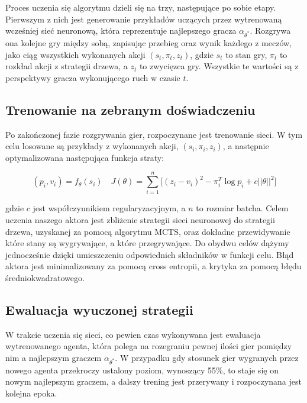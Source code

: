 \documentclass[licencjacka]{pracamgr}
\begin{document}
Proces uczenia się algorytmu dzieli się na trzy, następujące po sobie etapy. Pierwszym z nich jest generowanie przykładów uczących przez wytrenowaną wcześniej sieć neuronową, która reprezentuje najlepszego gracza $\alpha_{\theta^\ast}$. Rozgrywa ona kolejne gry między sobą, zapisując przebieg oraz wynik każdego z meczów, jako ciąg wszystkich wykonanych akcji $(s_t, \pi_t, z_t)$, gdzie $s_t$ to stan gry, $\pi_t$ to rozkład akcji z strategii drzewa, a $z_t$ to zwycięzca gry. Wszystkie te wartości są z perspektywy gracza wykonującego ruch w czasie $t$.

\subsection{Trenowanie na zebranym doświadczeniu}

Po zakończonej fazie rozgrywania gier, rozpoczynane jest trenowanie sieci. W tym celu losowane są przykłady z wykonanych akcji, $(s_i, \pi_i, z_i)$, a następnie optymalizowana następująca funkcja straty:

$$ (p_i, v_i) = f_\theta(s_i) \quad
J(\theta) = \sum_{i = 1}^n \Big[ (z_i - v_i)^2 - \pi_i^T \log p_i + c \lvert \lvert \theta \rvert \rvert^2 \Big]
$$

gdzie $c$ jest współczynnikiem regularyzacyjnym, a $n$ to rozmiar batcha. Celem uczenia naszego aktora jest zbliżenie strategii sieci neuronowej do strategii drzewa, uzyskanej za pomocą algorytmu MCTS, oraz dokładne przewidywanie które stany są wygrywające, a które przegrywające. Do obydwu celów dążymy jednocześnie dzięki umieszczeniu odpowiednich składników w funkcji celu. Błąd aktora jest minimalizowany za pomocą cross entropii, a krytyka za pomocą błędu średniokwadratowego.

\subsection{Ewaluacja wyuczonej strategii}

W trakcie uczenia się sieci, co pewien czas wykonywana jest ewaluacja wytrenowanego agenta, która polega na rozegraniu pewnej ilości gier pomiędzy nim a najlepszym graczem $\alpha_{\theta^\ast}$. W przypadku gdy stosunek gier wygranych przez nowego agenta przekroczy ustalony poziom, wynoszący 55\%, to staje się on nowym najlepszym graczem, a dalszy trening jest przerywany i rozpoczynana jest kolejna epoka.
\end{document}
